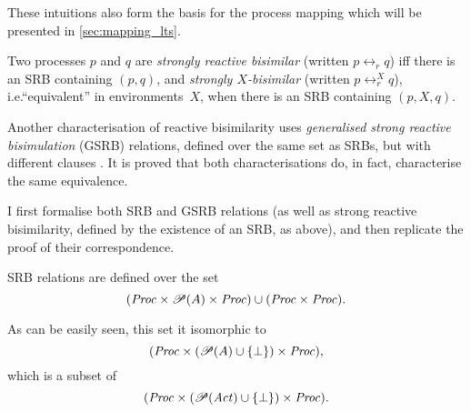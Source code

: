 \begin{isabellebody}
\begin{isamarkuptext}
These intuitions also form the basis for the process mapping which will be presented in \cref{sec:mapping_lts}.%
\end{isamarkuptext}\isamarkuptrue%
%
\isadelimdocument
%
\endisadelimdocument
%
\isatagdocument
%
\isamarkuptrue%
%
\endisatagdocument
{\isafolddocument}%
%
\isadelimdocument
%
\endisadelimdocument
%
\begin{isamarkuptext}%
Two processes $p$ and $q$ are \emph{strongly reactive bisimilar} (written $p \leftrightarrow_r q$) iff there is an SRB containing $(p,q)$, and \emph{strongly $X$-bisimilar} (written $p \leftrightarrow_r^X q$), i.e.\@ \enquote{equivalent} in environments~$X$, when there is an SRB containing $(p,X,q)$.%
\end{isamarkuptext}\isamarkuptrue%
%
\isadelimdocument
%
\endisadelimdocument
%
\isatagdocument
%
\isamarkuptrue%
%
\endisatagdocument
{\isafolddocument}%
%
\isadelimdocument
%
\endisadelimdocument
%
\begin{isamarkuptext}%
Another characterisation of reactive bisimilarity uses \emph{generalised strong reactive bisimulation} (GSRB) relations, defined over the same set as SRBs, but with different clauses \cite[Definition 3]{rbs}. It is proved that both characterisations do, in fact, characterise the same equivalence.%
\end{isamarkuptext}\isamarkuptrue%
%
\isadelimdocument
%
\endisadelimdocument
%
\isatagdocument
%
\isamarkuptrue%
%
\endisatagdocument
{\isafolddocument}%
%
\isadelimdocument
%
\endisadelimdocument
%
\begin{isamarkuptext}%
I first formalise both SRB and GSRB relations (as well as strong reactive bisimilarity, defined by the existence of an SRB, as above), and then replicate the proof of their correspondence.%
\end{isamarkuptext}\isamarkuptrue%
%
\isadelimdocument
%
\endisadelimdocument
%
\isatagdocument
%
\isamarkuptrue%
%
\endisatagdocument
{\isafolddocument}%
%
\isadelimdocument
%
\endisadelimdocument
%
\begin{isamarkuptext}%
SRB relations are defined over the set
$$(\mathit{Proc} \times \mathscr{P}(A) \times \mathit{Proc}) \cup (\mathit{Proc} \times \mathit{Proc}).$$

As can be easily seen, this set it isomorphic to
$$(\mathit{Proc} \times (\mathscr{P}(A) \cup \{\bot\}) \times \mathit{Proc}),$$
which is a subset of
$$(\mathit{Proc} \times (\mathscr{P}(\mathit{Act}) \cup \{\bot\}) \times \mathit{Proc}).$$ 


\end{isamarkuptext}
\end{isabellebody}
